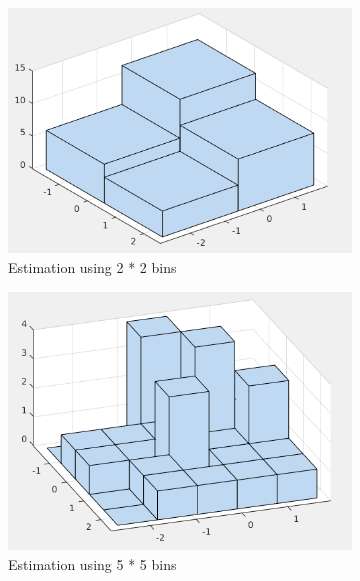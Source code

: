 \documentclass[12pt]{article}
\begin{document}
\begin{itemize}
\begin{figure}
\centering
\begin{subfigure}{0.45\textwidth}
\centering
\includegraphics[scale=0.35]{Imgs/5-26.png}
\caption{Estimation using 2 * 2 bins}
\end{subfigure}
\begin{subfigure}{0.45\textwidth}
\centering
\includegraphics[scale=0.35]{Imgs/5-27.png}
\caption{Estimation using 5 * 5 bins}
\end{subfigure}
\begin{subfigure}{0.45\textwidth}
\centering

\end{subfigure}
\end{figure}
\end{itemize}
\end{document}
